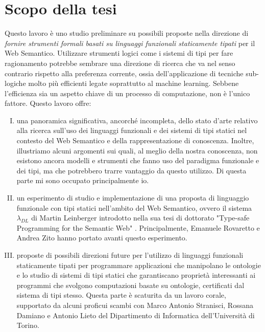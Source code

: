 \newpage
\section{Scopo della tesi}
Questo lavoro è uno studio preliminare su possibili proposte nella direzione di \textsl{fornire strumenti formali basati su linguaggi funzionali staticamente tipati} per il Web Semantico. Utilizzare strumenti logici come i sistemi di tipi per fare ragionamento potrebbe sembrare una direzione di ricerca che va nel senso contrario rispetto alla preferenza corrente, ossia dell'applicazione di tecniche sub-logiche molto più efficienti legate soprattutto al machine learning. Sebbene l'efficienza sia un aspetto chiave di un processo di computazione, non è l'unico fattore.
\noindent
Questo lavoro offre:
\begin{enumerate}[I.]

	\item una panoramica significativa, ancorché incompleta, dello stato d'arte relativo alla ricerca sull'uso dei linguaggi funzionali e dei sistemi di tipi statici nel contesto del Web Semantico e della rappresentazione di conoscenza. Inoltre, illustriamo alcuni argomenti sui quali, al meglio della nostra conoscenza, non esistono ancora modelli e strumenti che fanno uso del paradigma funzionale e dei tipi, ma che potrebbero trarre vantaggio da questo utilizzo. Di questa parte mi sono occupato principalmente io.
	\item  un esperimento di studio e implementazione di una proposta di linguaggio funzionale con tipi statici nell'ambito del Web Semantico, ovvero il sistema $\lambda_{DL}$ di Martin Leinberger introdotto nella sua tesi di dottorato "Type-safe Programming for the Semantic Web" \cite{leinbergerphdthesis}. Principalmente, Emanuele Rovaretto e Andrea Zito hanno portato avanti questo esperimento.
	\item proposte di possibili direzioni future per l'utilizzo di linguaggi funzionali staticamente tipati per programmare applicazioni che manipolano le ontologie e lo studio di sistemi di tipi statici che garantiscano proprietà interessanti ai programmi che svolgono computazioni basate su ontologie, certificati dal sistema di tipi stesso. Questa parte è scaturita da un lavoro corale, supportato da alcuni proficui scambi con Marco Antonio Stranisci, Rossana Damiano e Antonio Lieto del Dipartimento di Informatica dell'Università di Torino.
\end{enumerate}
\noindent
